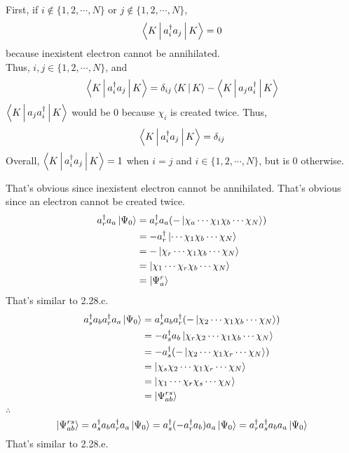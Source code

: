 \documentclass[a4paper]{article}
\begin{document}
First, if $ i\notin \{1,2,\cdots,N\} $ or $ j\notin \{1,2,\cdots,N\} $, \begin{equation}\label{key}
\Braket{K | a_i^\dagger a_j | K} = 0
\end{equation}
because inexistent electron cannot be annihilated.\\
Thus, $ i,j\in \{1,2,\cdots,N\} $, and
\begin{equation}\label{key}
\Braket{K | a_i^\dagger a_j | K} = \delta_{ij}\Braket{K|K} - \Braket{K | a_j a_i^\dagger | K}
\end{equation}
$ \Braket{K | a_j a_i^\dagger | K} $ would be $ 0 $ because $ \chi_i $ is created twice. Thus,
\begin{equation}\label{key}
\Braket{K | a_i^\dagger a_j | K} = \delta_{ij}
\end{equation}
Overall, $ \Braket{K | a_i^\dagger a_j | K} = 1$ when $ i=j $ and $ i\in \{1,2,\cdots,N\} $, but is $ 0 $ otherwise.

That's obvious since inexistent electron cannot be annihilated.
That's obvious since an electron cannot be created twice.
\begin{equation}\label{key}
\begin{aligned}
a_r^\dagger a_a\ket{\Psi_0} &= a_r^\dagger a_a (-\ket{\chi_a\cdots\chi_1\chi_b\cdots\chi_N})\\
&= -a_r^\dagger\ket{\cdots\chi_1\chi_b\cdots\chi_N}\\
&= -\ket{\chi_r\cdots\chi_1\chi_b\cdots\chi_N}\\
&= \ket{\chi_1\cdots\chi_r\chi_b\cdots\chi_N}\\
&= \ket{\Psi_a^r}
\end{aligned}
\end{equation}
That's similar to 2.28.c.
\begin{equation}\label{key}
\begin{aligned}
a_s^\dagger a_b a_r^\dagger a_a\ket{\Psi_0} 
&= a_s^\dagger a_b a_r^\dagger (-\ket{\chi_2\cdots\chi_1\chi_b\cdots\chi_N}) \\
&= -a_s^\dagger a_b \ket{\chi_r\chi_2\cdots\chi_1\chi_b\cdots\chi_N}\\
&= -a_s^\dagger (-\ket{\chi_2\cdots\chi_1\chi_r\cdots\chi_N}) \\
&= \ket{\chi_s\chi_2\cdots\chi_1\chi_r\cdots\chi_N}\\
&= \ket{\chi_1\cdots\chi_r\chi_s\cdots\chi_N}\\
&= \ket{\Psi_{ab}^{rs}}
\end{aligned}
\end{equation}
$ \therefore $
\begin{equation}\label{key}
\ket{\Psi_{ab}^{rs}} = a_s^\dagger a_b a_r^\dagger a_a\ket{\Psi_0} = a_s^\dagger (-a_r^\dagger a_b) a_a\ket{\Psi_0} = a_r^\dagger a_s^\dagger  a_b a_a\ket{\Psi_0} 
\end{equation}
That's similar to 2.28.e.
\end{document}
